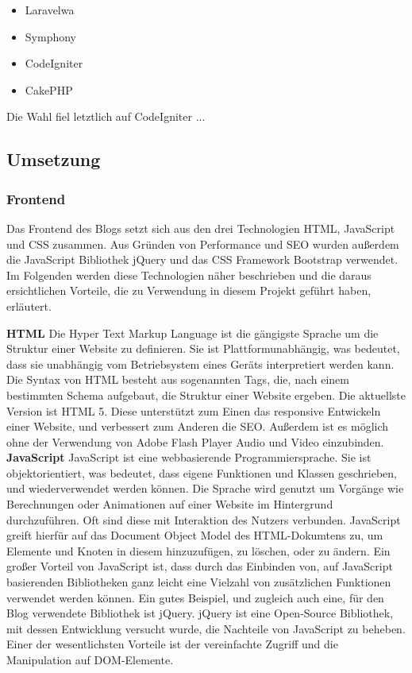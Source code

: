     \begin{itemize}
      \item Laravelwa
      \item Symphony
      \item CodeIgniter
      \item CakePHP
    \end{itemize}

    Die Wahl fiel letztlich auf CodeIgniter ...

  \subsection{Umsetzung}

    \subsubsection{Frontend}
    Das Frontend des Blogs setzt sich aus den drei Technologien HTML, JavaScript und CSS zusammen. Aus Gründen von Performance und SEO wurden außerdem
    die JavaScript Bibliothek jQuery und das CSS Framework Bootstrap verwendet. Im Folgenden werden diese Technologien näher beschrieben und die daraus
    ersichtlichen Vorteile, die zu Verwendung in diesem Projekt geführt haben, erläutert.

    \textbf{HTML}
    {Die Hyper Text Markup Language\cite{html}} ist die gängigste Sprache um die Struktur einer Website zu definieren. Sie ist Plattformunabhängig, was bedeutet,
    dass sie unabhängig vom Betriebsystem eines Geräts interpretiert werden kann. Die Syntax von HTML besteht aus sogenannten Tags, die, nach einem
    bestimmten Schema aufgebaut, die Struktur einer Website ergeben. Die aktuellste Version ist HTML 5. Diese unterstützt zum Einen das responsive
    Entwickeln einer Website, und verbessert zum Anderen die SEO. Außerdem ist es möglich ohne der Verwendung von Adobe Flash Player Audio und Video einzubinden.\\

    \textbf{JavaScript}
    {JavaScript\cite{javascript}} ist eine webbasierende Programmiersprache. Sie ist objektorientiert, was bedeutet, dass eigene Funktionen und Klassen geschrieben, und wiederverwendet
    werden können. Die Sprache wird genutzt um Vorgänge wie Berechnungen oder Animationen auf einer Website im Hintergrund durchzuführen. Oft sind diese mit Interaktion
    des Nutzers verbunden. JavaScript greift hierfür auf das Document Object Model des HTML-Dokumtens zu, um Elemente und Knoten in diesem hinzuzufügen, zu löschen, oder
    zu ändern. Ein großer Vorteil von JavaScript ist, dass durch das Einbinden von, auf JavaScript basierenden Bibliotheken ganz leicht eine Vielzahl von zusätzlichen Funktionen
    verwendet werden können.
    Ein gutes Beispiel, und zugleich auch eine, für den Blog verwendete Bibliothek ist {jQuery\cite{jquery}}.
    jQuery ist eine Open-Source Bibliothek, mit dessen Entwicklung versucht wurde, die Nachteile von JavaScript zu beheben. Einer der wesentlichsten Vorteile ist
    der vereinfachte Zugriff und die Manipulation auf DOM-Elemente.


